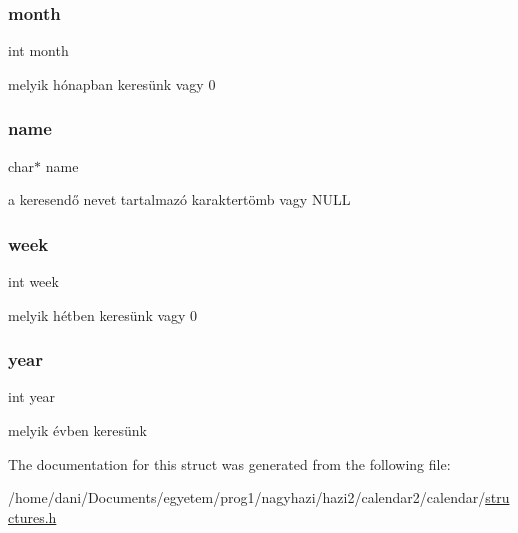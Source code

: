 \subsubsection{\texorpdfstring{month}{month}}
{\footnotesize\ttfamily int month}

melyik hónapban keresünk vagy 0 \mbox{\label{struct_search_conditions_a5ac083a645d964373f022d03df4849c8}} 
\subsubsection{\texorpdfstring{name}{name}}
{\footnotesize\ttfamily char$\ast$ name}

a keresendő nevet tartalmazó karaktertömb vagy N\+U\+LL \mbox{\label{struct_search_conditions_a3560bdec25d509ef8f4f02409eaa9f1d}} 
\subsubsection{\texorpdfstring{week}{week}}
{\footnotesize\ttfamily int week}

melyik hétben keresünk vagy 0 \mbox{\label{struct_search_conditions_abeac221e38b7b9ce7df8722c842bf671}} 
\subsubsection{\texorpdfstring{year}{year}}
{\footnotesize\ttfamily int year}

melyik évben keresünk 

The documentation for this struct was generated from the following file\+:\begin{DoxyCompactItemize}
\item 
/home/dani/\+Documents/egyetem/prog1/nagyhazi/hazi2/calendar2/calendar/\hyperlink{structures_8h}{structures.\+h}\end{DoxyCompactItemize}
